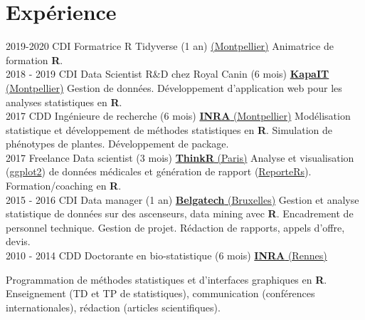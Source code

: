 \documentclass[letterpaper]{twentysecondcv} %
\begin{document}
\makeprofile %


\section{Expérience}

\begin{twenty} %
\twentyitem
    	{2019-2020}
		{CDI}
        {Formatrice R Tidyverse \textnormal{(1 an)}}
        {\href{http://www.kapa-it.fr/}{ (Montpellier)}}
        {}
        {
        Animatrice de formation \textbf{R}.
        }
        \\
\twentyitem
    	{2018 - 2019}
		{CDI}
        {Data Scientist R\&D chez Royal Canin \textnormal{(6 mois)}}
        {\href{http://www.kapa-it.fr/}{\textbf{KapaIT} (Montpellier)}}
        {}
        {
        Gestion de données. Développement d'application web pour les analyses statistiques en \textbf{R}.
        }
        \\
\twentyitem
    	{2017}
		{CDD}
        {Ingénieure de recherche \textnormal{(6 mois)}}
        {\href{https://www6.montpellier.inra.fr/mistea/}{\textbf{INRA} (Montpellier)}}
        {}
        {
        Modélisation statistique et développement de méthodes statistiques en \textbf{R}. 
        Simulation de phénotypes de plantes. Développement de package.
        }
        \\
	\twentyitem
    	{2017}
		{Freelance}
        {Data scientist \textnormal{(3 mois)}}
        {\href{https://thinkr.fr/}{\textbf{ThinkR} (Paris)}}
        {}
        {
        {
        Analyse et visualisation (\href{https://ggplot2.tidyverse.org/}{ggplot2}) de données médicales et génération de rapport 
        (\href{https://davidgohel.github.io/ReporteRs/}{ReporteRs}). Formation/coaching en \textbf{R}.
        }
        }
    \\   
     \twentyitem
   		{2015 - 2016}
		{CDI}
        {Data manager \textnormal{(1 an)}}
        {\href{https://www.belgatech-engineering.com/}{\textbf{Belgatech} (Bruxelles)}}
        {}
        {
        Gestion et analyse statistique de données sur des ascenseurs, data mining avec \textbf{R}. 
        Encadrement de personnel technique. Gestion de projet. Rédaction de rapports, appels d’offre, devis.
    	}
    	    \\   
    \twentyitem
   		{2010 - 2014}
		{CDD}
        {Doctorante en bio-statistique \textnormal{(6 mois)}}
        {\href{https://www6.rennes.inra.fr/pegase}{\textbf{INRA} (Rennes)}}
        {}
        {Programmation de méthodes statistiques et d’interfaces graphiques en \textbf{R}. Enseignement (TD et TP de statistiques), communication (conférences internationales), rédaction (articles scientifiques).
    
}
\end{twenty}
\end{document}
